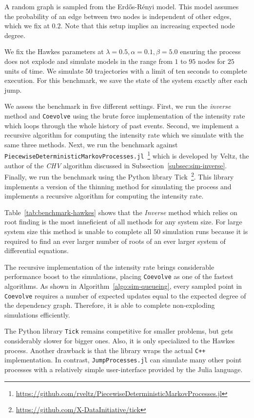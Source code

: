 \documentclass{juliacon}
\numberwithin{equation}{section}
\begin{document}
A random graph is sampled from the Erd\H{o}s-Rényi model. This model assumes the probability of an edge between two nodes is independent of other edges, which we fix at \( 0.2 \). Note that this setup implies an increasing expected node degree.

We fix the Hawkes parameters at \( \lambda = 0.5 , \alpha = 0.1 , \beta = 5.0 \) ensuring the process does not explode and simulate models in the range from \( 1 \) to \( 95 \) nodes for \( 25 \) units of time. We simulate \( 50 \) trajectories with a limit of ten seconds to complete execution. For this benchmark, we save the state of the system exactly after each jump.

We assess the benchmark in five different settings. First, we run the \textit{inverse} method and \texttt{Coevolve} using the brute force implementation of the intensity rate which loops through the whole history of past events. Second, we implement a recursive algorithm for computing the intensity rate which we simulate with the same three methods. Next, we run the benchmark against \texttt{PiecewiseDeterministicMarkovProcesses.jl}~\footnote{\url{https://github.com/rveltz/PiecewiseDeterministicMarkovProcesses.jl}} which is developed by Veltz, the author of the \textit{CHV} algorithm discussed in Subsection~\ref{subsec:sim-inverse}. Finally, we run the benchmark using the Python library Tick~\footnote{\url{https://github.com/X-DataInitiative/tick}}. This library implements a version of the thinning method for simulating the process and implements a recursive algorithm for computing the intensity rate.

Table~\ref{tab:benchmark-hawkes} shows that the \textit{Inverse} method which relies on root finding is the most inneficient of all methods for any system size. For large system size this method is unable to complete all \( 50 \) simulation runs because it is required to find an ever larger number of roots of an ever larger system of differential equations.

The recursive implementation of the intensity rate brings considerable performance boost to the simulations, placing \texttt{Coevolve} as one of the fastest algorithms. As shown in Algorithm~\ref{algo:sim-queueing}, every sampled point in \texttt{Coevolve} requires a number of expected updates equal to the expected degree of the dependency graph. Therefore, it is able to complete non-exploding simulations efficiently.

The Python library \texttt{Tick} remains competitive for smaller problems, but gets considerably slower for bigger ones. Also, it is only specialized to the Hawkes process. Another drawback is that the library wraps the actual \texttt{C++} implementation. In contrast, \texttt{JumpProcesses.jl} can simulate many other point processes with a relatively simple user-interface provided by the Julia language. 
\end{document}
